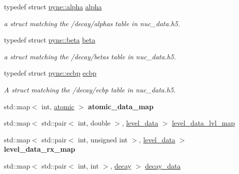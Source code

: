 \begin{DoxyCompactItemize}
typedef struct \hyperlink{structpyne_1_1alpha}{pyne\+::alpha} \hyperlink{namespacepyne_a3fc79ae6aadb879f43b288c4241ab398}{alpha}
\begin{DoxyCompactList}\small\item\em a struct matching the \textquotesingle{}/decay/alphas\textquotesingle{} table in nuc\+\_\+data.\+h5. \end{DoxyCompactList}\item 
\mbox{\label{namespacepyne_ae80bdf847bfa789021a5dafc132772e1}} 
typedef struct \hyperlink{structpyne_1_1beta}{pyne\+::beta} \hyperlink{namespacepyne_ae80bdf847bfa789021a5dafc132772e1}{beta}
\begin{DoxyCompactList}\small\item\em a struct matching the \textquotesingle{}/decay/betas\textquotesingle{} table in nuc\+\_\+data.\+h5. \end{DoxyCompactList}\item 
\mbox{\label{namespacepyne_a172aa77622d272744ca413d8e1f89735}} 
typedef struct \hyperlink{structpyne_1_1ecbp}{pyne\+::ecbp} \hyperlink{namespacepyne_a172aa77622d272744ca413d8e1f89735}{ecbp}
\begin{DoxyCompactList}\small\item\em A struct matching the \textquotesingle{}/decay/ecbp\textquotesingle{} table in nuc\+\_\+data.\+h5. \end{DoxyCompactList}\item 
\mbox{\label{namespacepyne_ac53d31be0627daff52e6f9b4afc13ab5}} 
std\+::map$<$ int, \hyperlink{structpyne_1_1atomic}{atomic} $>$ {\bfseries atomic\+\_\+data\+\_\+map}
\item 
std\+::map$<$ std\+::pair$<$ int, double $>$, \hyperlink{structpyne_1_1level__data}{level\+\_\+data} $>$ \hyperlink{namespacepyne_aa5b6136e3970959756640b867754bb62}{level\+\_\+data\+\_\+lvl\+\_\+map}
\item 
\mbox{\label{namespacepyne_ae1858b7f76aa7faa5c758f6a42332202}} 
std\+::map$<$ std\+::pair$<$ int, unsigned int $>$, \hyperlink{structpyne_1_1level__data}{level\+\_\+data} $>$ {\bfseries level\+\_\+data\+\_\+rx\+\_\+map}
\item 
std\+::map$<$ std\+::pair$<$ int, int $>$, \hyperlink{structpyne_1_1decay}{decay} $>$ \hyperlink{namespacepyne_ac880c3701eca3453cb9cdfab30195d65}{decay\+\_\+data}

\end{DoxyCompactItemize}
